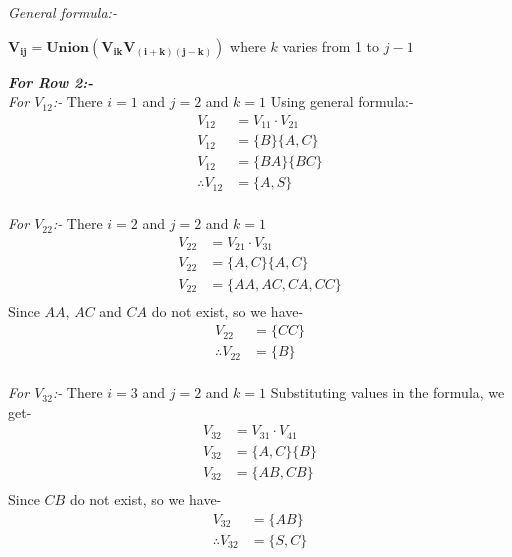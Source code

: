 \documentclass[12pt]{book}
\begin{document}
\textit{General formula:-}\\
\begin{center}
$\mathbf{V_{ij} = Union(V_{ik} V_{(i+k)(j-k)} )}$ where $k$ varies from 1 to $j-1$
\end{center}

\textbf{\textit{For Row 2:-}}\\
\textit{For $V_{12}$:-}\newline
There $i = 1$ and  $j = 2$ and $k = 1$\newline
Using general formula:-
\begin{align*}
V_{12} &= V_{11} \cdot V_{21}\\
V_{12} &= \{ B \} \{ A , C \}\\
V_{12} &= \{ BA \} \{ BC \}\\
\therefore V_{12} &= \{ A , S \}\\
\end{align*}

\textit{For $V_{22}$:-}\newline
There $i = 2$ and  $j = 2$ and $k = 1$
\begin{align*}
V_{22} &= V_{21} \cdot V_{31}\\
V_{22} &= \{ A, C \} \{ A , C \}\\
V_{22} &= \{ AA, AC, CA, CC \}\\
\end{align*}
Since $AA$, $AC$ and $CA$ do not exist, so we have-
\begin{align*}
V_{22} &= \{ CC \}\\
\therefore V_{22} &= \{ B \}\\
\end{align*}

\textit{For $V_{32}$:-}\newline
There $i = 3$ and  $j = 2$ and $k = 1$\newline
Substituting values in the formula, we get-
\begin{align*}
V_{32} &= V_{31} \cdot V_{41}\\
V_{32} &= \{ A, C \} \{ B \}\\
V_{32} &= \{ AB, CB \}\\
\end{align*}
Since $CB$ do not exist, so we have-
\begin{align*}
V_{32} &= \{ AB \}\\
\therefore V_{32} &= \{ S, C \}\\
\end{align*}
\end{document}

